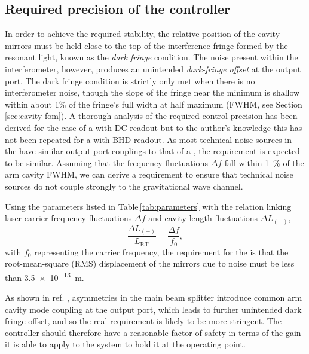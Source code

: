 
\subsection{\label{sec:ssm-required-control}Required precision of the controller}

In order to achieve the required stability, the relative position of the cavity mirrors must be held close to the top of the interference fringe formed by the resonant light, known as the \emph{dark fringe} condition. The noise present within the interferometer, however, produces an unintended \emph{dark-fringe offset} at the output port. The dark fringe condition is strictly only met when there is no interferometer noise, though the slope of the fringe near the minimum is shallow within about 1\% of the fringe's full width at half maximum (\gls{FWHM}, see Section\,\ref{sec:cavity-fom}). A thorough analysis of the required control precision has been derived for the case of a \DRFPMI{} with \gls{DC} readout \cite{Vajente2011} but to the author's knowledge this has not been repeated for a \SSM{} with \gls{BHD} readout. As most technical noise sources in the \SSM{} have similar output port couplings to that of a \MI{}, the requirement is expected to be similar. Assuming that the frequency fluctuations $\Delta f$ fall within \SI{1}{\percent} of the arm cavity \gls{FWHM}, we can derive a requirement to ensure that technical noise sources do not couple strongly to the gravitational wave channel.

Using the parameters listed in Table\,\ref{tab:parameters} with the relation linking laser carrier frequency fluctuations $\Delta f$ and cavity length fluctuations $\Delta L_{\left(-\right)}$,
\begin{equation}
  \frac{\Delta L_{\left(-\right)}}{L_{\textrm{RT}}} = \frac{\Delta f}{f_{0}},
\end{equation}
with $f_{0}$ representing the carrier frequency, the requirement for the \SSMEXPT{} is that the root-mean-square (\gls{RMS}) displacement of the mirrors due to noise must be less than \SI{3.5e-13}{\meter}.

As shown in ref. \cite{Danilishin2015}, asymmetries in the main beam splitter introduce common arm cavity mode coupling at the output port, which leads to further unintended dark fringe offset, and so the real requirement is likely to be more stringent. The controller should therefore have a reasonable factor of safety in terms of the gain it is able to apply to the system to hold it at the operating point.

